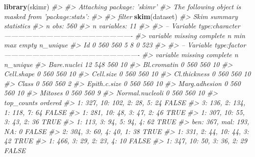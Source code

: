 \documentclass[]{book}
\newenvironment{Shaded}{\begin{snugshade}}{\end{snugshade}}
\newcommand{\CommentTok}[1]{\textcolor[rgb]{0.56,0.35,0.01}{\textit{#1}}}
\newcommand{\KeywordTok}[1]{\textcolor[rgb]{0.13,0.29,0.53}{\textbf{#1}}}
\newcommand{\NormalTok}[1]{#1}
\begin{document}
\begin{Shaded}
\begin{Highlighting}[]
\KeywordTok{library}\NormalTok{(skimr)}
\CommentTok{#> }
\CommentTok{#> Attaching package: 'skimr'}
\CommentTok{#> The following object is masked from 'package:stats':}
\CommentTok{#> }
\CommentTok{#>     filter}
\KeywordTok{skim}\NormalTok{(dataset)}
\CommentTok{#> Skim summary statistics}
\CommentTok{#>  n obs: 560 }
\CommentTok{#>  n variables: 11 }
\CommentTok{#> }
\CommentTok{#> -- Variable type:character -------------------------------------------------------}
\CommentTok{#>  variable missing complete   n min max empty n_unique}
\CommentTok{#>        Id       0      560 560   5   8     0      523}
\CommentTok{#> }
\CommentTok{#> -- Variable type:factor ----------------------------------------------------------}
\CommentTok{#>         variable missing complete   n n_unique}
\CommentTok{#>      Bare.nuclei      12      548 560       10}
\CommentTok{#>      Bl.cromatin       0      560 560       10}
\CommentTok{#>       Cell.shape       0      560 560       10}
\CommentTok{#>        Cell.size       0      560 560       10}
\CommentTok{#>     Cl.thickness       0      560 560       10}
\CommentTok{#>            Class       0      560 560        2}
\CommentTok{#>     Epith.c.size       0      560 560       10}
\CommentTok{#>    Marg.adhesion       0      560 560       10}
\CommentTok{#>          Mitoses       0      560 560        9}
\CommentTok{#>  Normal.nucleoli       0      560 560       10}
\CommentTok{#>                     top_counts ordered}
\CommentTok{#>  1: 327, 10: 102, 2: 28, 5: 24   FALSE}
\CommentTok{#>  3: 136, 2: 134, 1: 118, 7: 64   FALSE}
\CommentTok{#>   1: 281, 10: 48, 3: 47, 2: 46    TRUE}
\CommentTok{#>   1: 307, 10: 55, 3: 43, 2: 36    TRUE}
\CommentTok{#>    1: 113, 3: 94, 5: 94, 4: 62    TRUE}
\CommentTok{#>      ben: 367, mal: 193, NA: 0   FALSE}
\CommentTok{#>    2: 304, 3: 60, 4: 40, 1: 38    TRUE}
\CommentTok{#>   1: 331, 2: 44, 10: 44, 3: 42    TRUE}
\CommentTok{#>    1: 466, 3: 29, 2: 23, 4: 10   FALSE}
\CommentTok{#>   1: 347, 10: 50, 3: 36, 2: 29   FALSE}
\end{Highlighting}
\end{Shaded}
\end{document}
